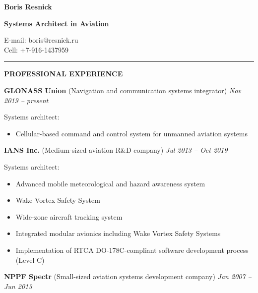 \documentclass[a4paper]{article}
\begin{document}
    \thispagestyle{empty}
    
	\begin{center}
		{\Large \textbf{Boris Resnick}\par}
		\vspace{2mm}
		{\large \textbf{Systems Architect in A\hspace{-.4mm}viation}\par}
		\vspace{1mm}
		E-mail: boris@resnick.ru\\
		Cell: +7-916-1437959
	\end{center}
	\vspace{-2mm}
	\rule{\textwidth}{1pt}
	\vspace{2mm}

	\textbf{PROFESSIONAL EXPERIENCE}
	\vspace{4mm}

	\textbf{GLONASS Union} (Navigation and communication systems integrator) \hfill \textit{Nov 2019 -- present}
	\vspace{1mm}
	
    Systems architect:
	\begin{itemize}
	    \setlength{\itemindent}{.5cm}
	    \item Cellular-based command and control system for unmanned aviation systems
    \end{itemize}
    \vspace{3mm}
    
    \textbf{IANS Inc.} (Medium-sized aviation R\&D company) \hfill \textit{ Jul 2013 -- Oct 2019}
    \vspace{1mm}
    
    Systems architect:
	\begin{itemize}
	    \setlength{\itemindent}{.5cm}
	    \item Advanced mobile meteorological and hazard awareness system
	    \item Wake Vortex Safety System
	    \item Wide-zone aircraft tracking system
	    \item Integrated modular avionics including Wake Vortex Safety Systems
	    \item Implementation of RTCA DO-178C-compliant software development process (Level C)
    \end{itemize}
    \vspace{3mm}
    
    \textbf{NPPF Spectr} (Small-sized aviation systems development company) \hfill \textit{Jan 2007 -- Jun 2013}
    \vspace{1mm}
    
\end{document}
